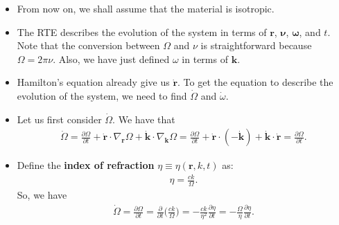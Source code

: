 \documentclass[10pt]{article}
\newcommand{\ve}[1]{\mathbf{#1}}
\begin{document}
\begin{itemize}
    \item From now on, we shall assume that the material is isotropic.
    
    \item The RTE describes the evolution of the system in terms of $\ve{r}$, $\ve{\nu}$, $\ve{\omega}$, and $t$.
    Note that the conversion between $\Omega$ and $\nu$ is straightforward because $\Omega = 2\pi \nu$. Also, we have just defined $\omega$ in terms of $\ve{k}$.

    \item Hamilton's equation already give us $\dot{\ve{r}}$. To get the equation to describe the evolution of the system, we need to find $\dot \Omega$ and $\dot \omega$.

    \item Let us first consider $\dot \Omega$. We have that
    \begin{align*}
      \dot \Omega 
      = \frac{\partial \Omega}{\partial t} + \dot{\ve{r}} \cdot \nabla_{\ve{r}}\Omega + \dot{\ve{k}} \cdot \nabla_{\ve{k}} \Omega
      = \frac{\partial \Omega}{\partial t} + \dot{\ve{r}} \cdot (- \dot{\ve{k}}) + \dot{\ve{k}} \cdot \dot{\ve{r}}
      = \frac{\partial \Omega}{\partial t}.
    \end{align*}

    \item Define the \textbf{index of refraction} $\eta \equiv \eta(\ve{r}, k, t)$ as:
    \begin{align*}
      \eta = \frac{ck}{\Omega}.
    \end{align*}
    So, we have
    \begin{align*}
      \dot \Omega 
      = \frac{\partial \Omega}{\partial t} 
      = \frac{\partial}{\partial t} \bigg( \frac{ck}{\Omega} \bigg)
      = -\frac{ck}{\eta^2} \frac{\partial \eta}{\partial t}
      = -\frac{\Omega}{\eta} \frac{\partial \eta}{\partial t}.
    \end{align*}


\end{itemize}
\end{document}
